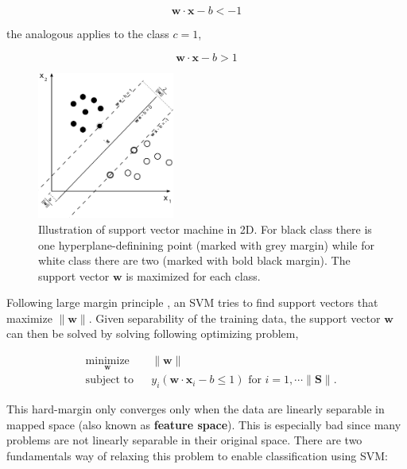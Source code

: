 \documentclass[pdftex,12pt,a4paper]{report}
\begin{document}
\begin{equation}
\mathbf{w} \cdot \mathbf{x} - b < -1
\label{equation:svm_class_1}
\end{equation}

the analogous applies to the class $c = 1$,

\begin{equation}
\mathbf{w} \cdot \mathbf{x} - b > 1
\label{equation:svm_class_2}
\end{equation}

\begin{figure}[H]
\centering
\includegraphics[width=0.4\textwidth]{images/svm}
\caption{Illustration of support vector machine in 2D. For black class there is one hyperplane-definining point (marked with grey margin) while for white class there are two (marked with bold black margin). The support vector $\mathbf{w}$ is maximized for each class.}
\label{fig:svm}
\end{figure}

Following large margin principle \cite{vapnik1964note, murphy2012machine}, an SVM tries to find support vectors that maximize $\| \mathbf{w} \|$. Given separability of the training data, the support vector $\mathbf{w}$ can then be solved by solving following optimizing problem, 

\begin{equation*}
\begin{aligned}
& \underset{\mathbf{
w}}{\text{minimize}}
& & \| \mathbf{w}\| \\
& \text{subject to}
& & y_i(\mathbf{w} \cdot \mathbf{x}_i - b \leq 1) \text{ for } i = 1, \cdots \| \mathbf{S} \|.
\end{aligned}
\label{eq:svm_hard_margin}
\end{equation*}

This hard-margin only converges only when the data are linearly separable in mapped space (also known as \textbf{feature space}). This is especially bad since many problems are not linearly separable in their original space. There are two fundamentals way of relaxing this problem to enable classification using SVM:
\end{document}
